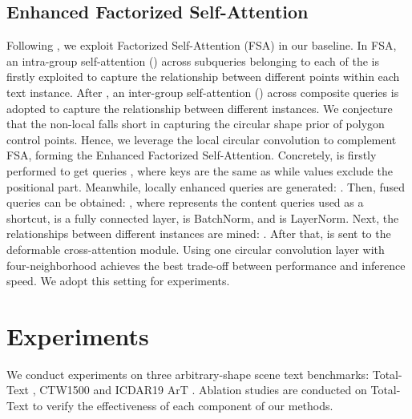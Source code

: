 \documentclass[letterpaper]{article} \usepackage{aaai23}  \usepackage{times}  \usepackage{helvet}  \usepackage{courier}  \usepackage[hyphens]{url}  \usepackage{graphicx} \urlstyle{rm}
\begin{document}
\subsection{Enhanced Factorized Self-Attention}
Following \cite{zhang2022text}, we exploit Factorized Self-Attention (FSA) \cite{dong2021visual} in our baseline. In FSA, an intra-group self-attention () across  subqueries belonging to each of the  is firstly exploited to capture the relationship between different points within each text instance. After , an inter-group self-attention () across  composite queries is adopted to capture the relationship between different instances. We conjecture that the non-local  falls short in capturing the circular shape prior of polygon control points. Hence, we leverage the local circular convolution \cite{peng2020deep} to complement FSA, forming the Enhanced Factorized Self-Attention. Concretely,  is firstly performed to get queries , where keys are the same as  while values exclude the positional part. Meanwhile, locally enhanced queries are generated: . Then, fused queries can be obtained: , where  represents the content queries used as a shortcut,  is a fully connected layer,  is BatchNorm, and  is LayerNorm. Next, the relationships between different instances are mined: . After that,  is sent to the deformable cross-attention module. Using one circular convolution layer with four-neighborhood achieves the best trade-off between performance and inference speed. We adopt this setting for experiments.



\section{Experiments}
\label{sec:exp}
We conduct experiments on three arbitrary-shape scene text benchmarks: Total-Text \cite{ch2020total}, CTW1500 \cite{liu2019curved} and ICDAR19 ArT \cite{chng2019icdar2019}. Ablation studies are conducted on Total-Text to verify the effectiveness of each component of our methods.
\end{document}

